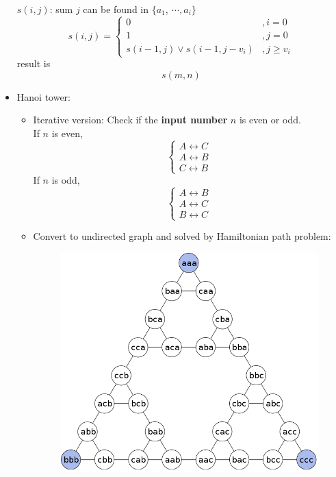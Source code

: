\begin{itemize}
    $s(i, j)$: sum $j$ can be found in $\{a_1, \ \cdots, a_i\}$ \begin{equation}
        s(i, j) = \begin{cases}
            0 &, i = 0 \\
            1 &, j = 0 \\
            s(i - 1, j) \lor s(i - 1, j - v_i) &, j \ge v_i
        \end{cases}
    \end{equation} result is \begin{equation}
        s(m, n)
    \end{equation}
    \item Hanoi tower:
    \begin{itemize}
        \item Iterative version: Check if the \textbf{input number} $n$ is even or odd. \\ 
            If $n$ is even, \begin{equation}
                \begin{cases}
                    A \leftrightarrow C \\
                    A \leftrightarrow B \\
                    C \leftrightarrow B
                \end{cases} 
            \end{equation} If $n$ is odd, \begin{equation}
                \begin{cases}
                    A \leftrightarrow B \\
                    A \leftrightarrow C \\
                    B \leftrightarrow C
                \end{cases} 
            \end{equation}
        \item Convert to undirected graph and solved by Hamiltonian path problem: 
            \begin{figure}[H]
                \centering
                \includegraphics[scale=0.3]{img/hanoi_tower_graph.png}

\end{figure}
\end{itemize}
\end{itemize}
